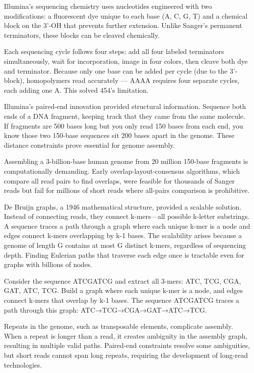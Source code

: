 Illumina's sequencing chemistry uses nucleotides engineered with two modifications: a fluorescent dye unique to each base (A, C, G, T) and a chemical block on the 3'-OH that prevents further extension. Unlike Sanger's permanent terminators, these blocks can be cleaved chemically.

Each sequencing cycle follows four steps: add all four labeled terminators simultaneously, wait for incorporation, image in four colors, then cleave both dye and terminator. Because only one base can be added per cycle (due to the 3'-block), homopolymers read accurately — AAAA requires four separate cycles, each adding one A. This solved 454's limitation.

Illumina's paired-end innovation provided structural information. Sequence both ends of a DNA fragment, keeping track that they came from the same molecule. If fragments are 500 bases long but you only read 150 bases from each end, you know those two 150-base sequences sit 200 bases apart in the genome. These distance constraints prove essential for genome assembly.

Assembling a 3-billion-base human genome from 20 million 150-base fragments is computationally demanding. Early overlap-layout-consensus algorithms, which compare all read pairs to find overlaps, were feasible for thousands of Sanger reads but fail for millions of short reads where all-pairs comparison is prohibitive.

De Bruijn graphs, a 1946 mathematical structure, provided a scalable solution. Instead of connecting reads, they connect k-mers—all possible k-letter substrings. A sequence traces a path through a graph where each unique k-mer is a node and edges connect k-mers overlapping by k-1 bases. The scalability arises because a genome of length G contains at most G distinct k-mers, regardless of sequencing depth. Finding Eulerian paths that traverse each edge once is tractable even for graphs with billions of nodes.

Consider the sequence ATCGATCG and extract all 3-mers: ATC, TCG, CGA, GAT, ATC, TCG. Build a graph where each unique k-mer is a node, and edges connect k-mers that overlap by k-1 bases. The sequence ATCGATCG traces a path through this graph: ATC→TCG→CGA→GAT→ATC→TCG.

Repeats in the genome, such as transposable elements, complicate assembly. When a repeat is longer than a read, it creates ambiguity in the assembly graph, resulting in multiple valid paths. Paired-end constraints resolve some ambiguities, but short reads cannot span long repeats, requiring the development of long-read technologies.

